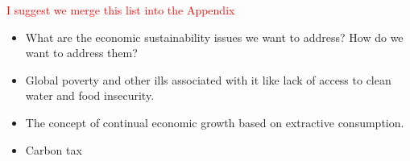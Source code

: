 \documentclass[12pt]{article}
\newcommand{\ins}[1]{\textcolor{red}{#1}}
\begin{document}
\ins{I suggest we merge this  list into the Appendix}
\begin{itemize}
\item{What are the economic sustainability issues we want to address? How do we want to address them?}
\item{Global poverty and other ills associated with it like lack of access to clean water and food insecurity.}
\item{The concept of continual economic growth based on extractive consumption.}
\item{Carbon tax}
\end{itemize}
%
%
%


\end{document}
